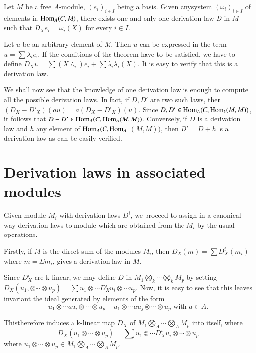 \begin{theorem}\label{chap1:sec2:thm1}%
  Let $M$ be a free $A$-module, $(e_i)_{i \in I}$ being a basis. Given
  any\pageoriginale system $(\omega_i)_{i \in I}$ of elements in $\operatorname{Hom}_A(C,M)$,
  there exists one and only one derivation law $D$ in $M$ such that
  $D_X e_i = \omega_i (X)$ for every $i \in I$.  
\end{theorem}

Let $u$ be an arbitrary element of $M$. Then $u$ can be  expressed in
the term $u= \sum \lambda_i e_i$. If the conditions  of the theorem have
to be satisfied, we have to define $D_X u = \sum (X \wedge_i) e_i +
\sum \lambda_i \lambda_i (X)$. It is easy to verify that this is a
derivation law. 

We shall now see that the knowledge of one derivation law is enough to
compute all the possible derivation laws. In fact, if $D,D'$ are two
such laws, then $(D_X- D'_X)(au)= a (D_X- D'_X) (u)$. Since $D,D' \in
\operatorname{Hom}_A (C, \operatorname{Hom}_k(M,M))$, it follows that $D-D' \in  \Hom_A(C,
\Hom_A\break (M,M))$. Conversely, if $D$ is a derivation law and $h$ any
element of $\operatorname{Hom}_A(C,\operatorname{Hom}_A$ $(M,M))$, then $D' = D+h$ is a derivation
law as can be easily verified. 

\section{Derivation laws in associated modules}\label{chap1:sec3} %

Given module $M_i$ with derivation laws $D^i$, we proceed to assign in
a canonical way derivation laws to module which are obtained from the
$M_i$ by the usual operations. 

Firstly, if $M$ is the direct sum of the modules $M_i$, then $D_X(m) =
\sum D_X^i(m_i)$ where $m= \Sigma m_i$, gives  a derivation law in
$M$. 

Since $D^i_X$ are k-linear, we may define  $D$ in $M_1 \bigotimes
\limits_k\cdots  \bigotimes \limits_k M_p$ by setting $D_X(u_1,
\otimes \cdots \otimes u_p) = \sum u_1 \otimes \cdots D^i_X u_i
\otimes \cdots u_p$. Now, it is easy to see that this  leaves
invariant the ideal generated by elements of the form 
$$
u_1 \otimes \cdots au_i \otimes \cdots \otimes u_p -u_1 \otimes \cdots
au_j \otimes \cdots \otimes u_p  \text{ with } a \in A.  
$$  

This\pageoriginale therefore induces a k-linear map $D_X$ of $M_1 \bigotimes
\limits_A  \cdots \bigotimes \limits_A M_p$ into itself, where  
$$
D_X(u_1 \otimes \cdots \otimes u_p)= \sum u_1 \otimes \cdots D_X^i u_i
\otimes \cdots \otimes u_p 
$$
where $u_1 \otimes \cdots \otimes u_p \in M_1 \bigotimes \limits_A
\cdots \bigotimes \limits_A M_p$. 

